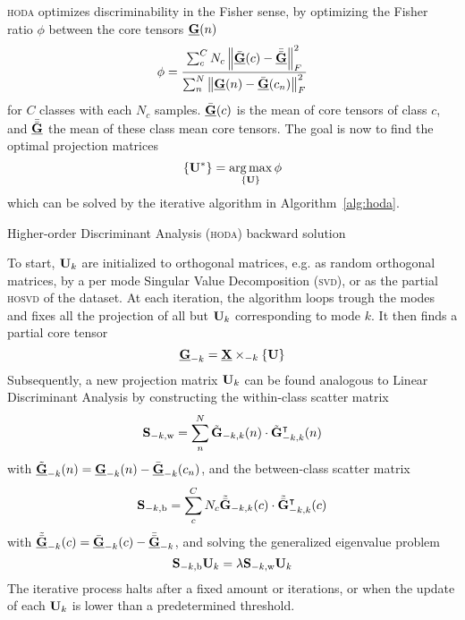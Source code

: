 \documentclass[twocolumn]{article}
\begin{document}
\textsc{hoda} optimizes discriminability in the Fisher sense, by optimizing the
Fisher ratio $\phi$ between the core tensors $\ten{G}(n)$
\begin{equation}
  \phi = \frac{\sum_c^CN_c\left\lVert\bar{\ten{G}}(c)-\bar{\bar{\ten{G}}}\right\rVert_F^2}
	{\sum_n^N\left\lVert\ten{G}(n)-\bar{\ten{G}}(c_n)\right\rVert_F^2}
	\label{eq:fisher}
\end{equation}
for $C$ classes with each $N_c$ samples. $\bar{\ten{G}}(c)$ is the mean of core
tensors of class $c$, and $\bar{\bar{\ten{G}}}$ the mean of
these class mean core tensors.
The goal is now to find the optimal projection matrices
\begin{equation}
  \left\{\mat{U}^*\right\} = \argmax_{\{\mat{U}\}}\phi
\end{equation}
which can be solved by the iterative algorithm in Algorithm~\ref{alg:hoda}.
\begin{algorithm}
  \caption{Higher-order Discriminant Analysis (\textsc{hoda}) backward solution}
  \label{alg:hoda}
  
\end{algorithm}
To start, $\mat{U}_k$ are initialized to orthogonal matrices, e.g. as random
orthogonal matrices, by a per mode Singular Value Decomposition (\textsc{svd}),
or as the partial \textsc{hosvd} of the dataset.
At each iteration, the algorithm loops trough the modes and fixes all the
projection of all but $\mat{U}_k$ corresponding to mode $k$.
It then finds a partial core tensor
\begin{equation}
  \ten{G}_{-k}=\ten{X}\mmprs{\mat{U}}{k}
\end{equation}
Subsequently, a new projection matrix $\mat{U}_k$ can be found analogous to Linear
Discriminant Analysis by constructing the within-class scatter matrix
\begin{equation}
  \mat{S}_{-k,\text{w}} = \sum_n^N\tilde{\mat{G}}_{-k,k}(n)\cdot\tilde{\mat{G}}_{-k,k}^\intercal(n)
\end{equation}
with $\tilde{\ten{G}}_{-k}(n) = \ten{G}_{-k}(n) - \bar{\ten{G}}_{-k}(c_n)$,
and the between-class scatter matrix
\begin{equation}
  \mat{S}_{-k,\text{b}} =
  \sum_c^CN_c\tilde{\bar{\mat{G}}}_{-k,k}(c)\cdot\tilde{\bar{\mat{G}}}_{-k,k}^\intercal(c)
\end{equation}
with $\tilde{\bar{\ten{G}}}_{-k}(c) = \bar{\ten{G}}_{-k}(c) - \bar{\bar{\ten{G}}}_{-k}$,
and solving the generalized eigenvalue problem
\begin{equation}
  \mat{S}_{-k,\text{b}}\mat{U}_k = \mat{\lambda}\mat{S}_{-k,\text{w}}\mat{U}_k
\end{equation}
The iterative process halts after a fixed amount or iterations, or when the
update of each $\mat{U}_k$ is lower than a predetermined threshold.
\end{document}
